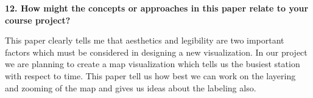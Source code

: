 \documentclass{article}[12pt]
\begin{document}
\vspace{2ex}\noindent
{\bf 12. How might the concepts or approaches in this paper relate to your course project? }

{
    This paper clearly tells me that aesthetics and legibility are two important factors which must be considered in designing a new visualization. In our project we are planning to create a map visualization which tells us the busiest station with respect to time. This paper tell us how best we can work on the layering and zooming of the map and gives us ideas about the labeling also.

}
\end{document}
